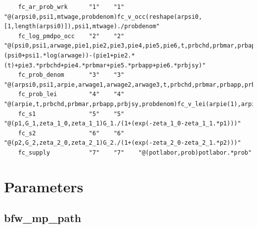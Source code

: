 \documentclass[
]{book}
\begin{document}
\begin{verbatim}
    fc_ar_prob_wrk      "1"    "1"    "@(arpsi0,psi1,mtwage,probdenom)fc_v_occ(reshape(arpsi0,[1,length(arpsi0)]),psi1,mtwage)./probdenom"                                                                                                                                                                        
    fc_log_pmdpo_occ    "2"    "2"    "@(psi0,psi1,arwage,pie1,pie2,pie3,pie4,pie5,pie6,t,prbchd,prbmar,prbapp,prbjsy)(psi0+psi1.*log(arwage))-(pie1+pie2.*(t)+pie3.*prbchd+pie4.*prbmar+pie5.*prbapp+pie6.*prbjsy)"                                                                                              
    fc_prob_denom       "3"    "3"    "@(arpsi0,psi1,arpie,arwage1,arwage2,arwage3,t,prbchd,prbmar,prbapp,prbjsy)fc_v_occ(arpsi0(1),psi1,arwage1)+fc_v_occ(arpsi0(2),psi1,arwage2)+fc_v_occ(arpsi0(3),psi1,arwage3)+fc_v_lei(arpie(1),arpie(2),arpie(3),arpie(4),arpie(5),arpie(6),t,prbchd,prbmar,prbapp,prbjsy)"
    fc_prob_lei         "4"    "4"    "@(arpie,t,prbchd,prbmar,prbapp,prbjsy,probdenom)fc_v_lei(arpie(1),arpie(2),arpie(3),arpie(4),arpie(5),arpie(6),t,prbchd,prbmar,prbapp,prbjsy)./probdenom"                                                                                                                  
    fc_s1               "5"    "5"    "@(p1,G_1,zeta_1_0,zeta_1_1)G_1./(1+(exp(-zeta_1_0-zeta_1_1.*p1)))"                                                                                                                                                                                                         
    fc_s2               "6"    "6"    "@(p2,G_2,zeta_2_0,zeta_2_1)G_2./(1+(exp(-zeta_2_0-zeta_2_1.*p2)))"                                                                                                                                                                                                         
    fc_supply           "7"    "7"    "@(potlabor,prob)potlabor.*prob"                                                                                                                                                                                                                                            
\end{verbatim}

\hypertarget{parameters}{%
\chapter{Parameters}\label{parameters}}

\hypertarget{bfw_mp_path}{%
\section{bfw\_mp\_path}\label{bfw_mp_path}}
\end{document}
